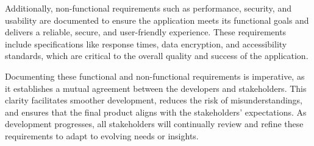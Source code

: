 Additionally, non-functional requirements such as performance, security, and usability are documented to ensure the application meets its functional goals and delivers a reliable, secure, and user-friendly experience. These requirements include specifications like response times, data encryption, and accessibility standards, which are critical to the overall quality and success of the application.

Documenting these functional and non-functional requirements is imperative, as it establishes a mutual agreement between the developers and stakeholders. This clarity facilitates smoother development, reduces the risk of misunderstandings, and ensures that the final product aligns with the stakeholders' expectations. As development progresses, all stakeholders will continually review and refine these requirements to adapt to evolving needs or insights.

\clearpage
